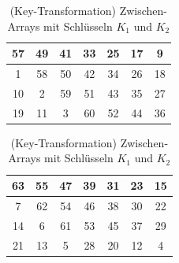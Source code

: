 \begin{table}[H]
    \centering
    \begin{minipage}[t]{0.45\textwidth}
        \begin{tabular}{|*{7}{c|}}
            \hline
            \cellcolor{magenta-1}57 & \cellcolor{cyan-1}49 & \cellcolor{purple-1}41 & \cellcolor{orange-1}33 & 
            \cellcolor{blue-1}25 & \cellcolor{green-1}17 & \cellcolor{yellow-1}9 \\

            \hline
            \cellcolor{red-1}1 & \cellcolor{magenta-1}58 & \cellcolor{cyan-1}50 & \cellcolor{purple-1}42 & 
            \cellcolor{orange-1}34 & \cellcolor{blue-1}26 & \cellcolor{green-1}18 \\

            \hline
            \cellcolor{yellow-1}10 & \cellcolor{red-1}2 & \cellcolor{magenta-1}59 & \cellcolor{cyan-1}51 & 
            \cellcolor{purple-1}43 & \cellcolor{orange-1}35 & \cellcolor{blue-1}27 \\

            \hline
            \cellcolor{green-1}19 & \cellcolor{yellow-1}11 & \cellcolor{red-1}3 & \cellcolor{magenta-1}60 & 
            \cellcolor{cyan-1}52 & \cellcolor{purple-1}44 & \cellcolor{orange-1}36  \\
            \hline
        \end{tabular}
    \end{minipage}
    \hfill
    \begin{minipage}[t]{0.45\textwidth}
        \begin{tabular}{|*{7}{c|}}
            \hline
            \cellcolor{magenta-1}63 & \cellcolor{cyan-1}55 & \cellcolor{purple-1}47 & \cellcolor{orange-1}39 & 
            \cellcolor{blue-1}31 & \cellcolor{green-1}23 & \cellcolor{yellow-1}15 \\

            \hline
            \cellcolor{red-1}7 & \cellcolor{magenta-1}62 & \cellcolor{cyan-1}54 & \cellcolor{purple-1}46 & 
            \cellcolor{orange-1}38 & \cellcolor{blue-1}30 & \cellcolor{green-1}22 \\

            \hline
            \cellcolor{yellow-1}14 & \cellcolor{red-1}6 & \cellcolor{magenta-1}61 & \cellcolor{cyan-1}53 & 
            \cellcolor{purple-1}45 & \cellcolor{orange-1}37 & \cellcolor{blue-1}29 \\

            \hline
            \cellcolor{green-1}21 & \cellcolor{yellow-1}13 & \cellcolor{red-1}5 & \cellcolor{blue-1}28 & 
            \cellcolor{green-1}20 & \cellcolor{yellow-1}12 & \cellcolor{red-1}4  \\
            \hline
        \end{tabular}
    \end{minipage}
    \caption{(Key-Transformation) Zwischen-Arrays mit Schlüsseln $K_1$ und $K_2$}
    \label{tab:key-tranformation-2}
\end{table}

